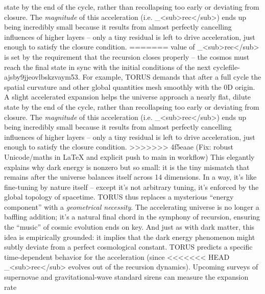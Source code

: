 \documentclass[]{article}
\begin{document}
state by the end of the cycle, rather than recollapsing too early or
deviating from closure\hspace{0pt}. The \emph{magnitude} of this
acceleration (i.e.
\Lambda\_\textless sub\textgreater rec\textless/sub\textgreater) ends up being
incredibly small because it results from almost perfectly cancelling
influences of higher layers -- only a tiny residual is left to drive
acceleration, just enough to satisfy the closure condition\hspace{0pt}.
=======
value of \Lambda\_\textless{}sub\textgreater{}rec\textless{}/sub\textgreater{}
is set by the requirement that the recursion closes properly -- the
cosmos must reach the final state in sync with the initial conditions of
the next cycle​file-ajsby9jjeovlbskzvaym53​. For example, TORUS demands
that after a full cycle the spatial curvature and other global
quantities mesh smoothly with the 0D origin. A slight accelerated
expansion helps the universe approach a nearly flat, dilute state by the
end of the cycle, rather than recollapsing too early or deviating from
closure​. The \emph{magnitude} of this acceleration (i.e.
\Lambda\_\textless{}sub\textgreater{}rec\textless{}/sub\textgreater{}) ends up
being incredibly small because it results from almost perfectly
cancelling influences of higher layers -- only a tiny residual is left
to drive acceleration, just enough to satisfy the closure condition​.
>>>>>>> 4f5eaae (Fix: robust Unicode/maths in LaTeX and explicit push to main in workflow)
This elegantly explains why dark energy is nonzero but so small: it is
the tiny mismatch that remains after the universe balances itself across
14 dimensions. In a way, it's like fine-tuning by nature itself --
except it's not arbitrary tuning, it's enforced by the global topology
of spacetime. TORUS thus replaces a mysterious ``energy component'' with
a \emph{geometrical necessity}. The accelerating universe is no longer a
baffling addition; it's a natural final chord in the symphony of
recursion, ensuring the ``music'' of cosmic evolution ends on key. And
just as with dark matter, this idea is empirically grounded: it implies
that the dark energy phenomenon might subtly deviate from a perfect
cosmological constant. TORUS predicts a specific time-dependent behavior
for the acceleration (since
<<<<<<< HEAD
\Lambda\_\textless sub\textgreater rec\textless/sub\textgreater{} evolves out
of the recursion dynamics)\hspace{0pt}. Upcoming surveys of supernovae
and gravitational-wave standard sirens can measure the expansion rate
\end{document}
